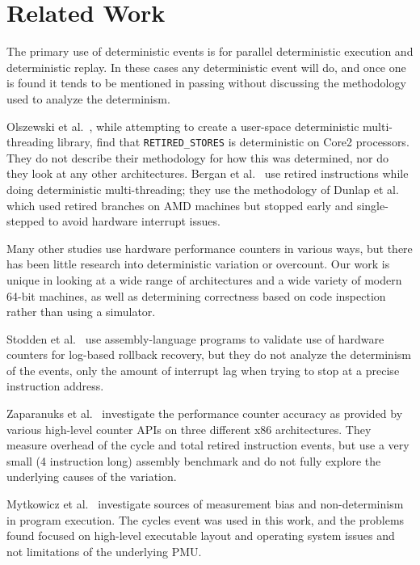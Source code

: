 \section{Related Work}

The primary use of deterministic events is for 
parallel deterministic execution and deterministic replay.
In these cases any deterministic event will do, and 
once one is found it tends to be mentioned in passing without
discussing the methodology used to analyze the
determinism.

Olszewski et al.~\cite{olszewski+:asplos09},
while attempting to create a user-space deterministic multi-threading library,
find that {\tt RETIRED\_STORES} is deterministic on Core2 processors.  They do
not describe their methodology for how this was determined, nor do they
look at any other architectures.
Bergan et al.~\cite{bergan+:osdi10} use retired instructions while
doing deterministic multi-threading; they use the methodology of
Dunlap et al.~\cite{dunlap+:osdi02} which used retired branches on
AMD machines but stopped early and single-stepped to avoid hardware
interrupt issues.  

Many other studies use hardware performance counters in various ways,
but there has been little research into deterministic variation or
overcount.
Our work is unique
in looking at a wide range of architectures and a wide variety of modern
64-bit machines, as well as determining correctness based on code inspection
rather than using a simulator.

Stodden et al.~\cite{stodden+:isas06} use assembly-language programs
to validate use of hardware counters for log-based rollback recovery,
but they do not analyze the determinism of the events, only the amount
of interrupt lag when trying to stop at a precise instruction address.

Zaparanuks et al.~\cite{zaparanuks+:ispass09} investigate the performance
counter accuracy as provided by various high-level counter APIs on
three different x86 architectures.  They measure overhead of the cycle
and total retired instruction events, but use a very small 
(4 instruction long) assembly benchmark and do not fully explore
the underlying causes of the variation.

Mytkowicz et al.~\cite{mytkowicz+:asplos09} investigate sources
of measurement bias and non-determinism in program execution.  
The cycles event was used in this work, and the
problems found focused on high-level executable layout and operating system
issues and not limitations of the underlying PMU.

